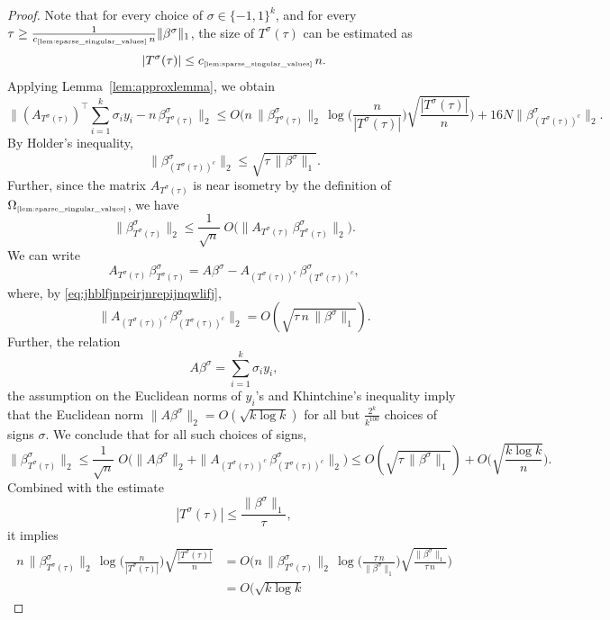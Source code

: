 \documentclass[11pt]{amsart}
\theoremstyle{definition}
\theoremstyle{plain}
\begin{document}
\begin{proof}
Note that for every choice of $\sigma\in\{-1,1\}^k$,
and for every $\tau\geq \frac{1}{c_{\text{\tiny\ref{lem:sparse_singular_values}}}\,n}
\|\beta^\sigma\|_1$,
the size of $T^\sigma(\tau)$ can be estimated as
$$
|T^\sigma(\tau)|\leq c_{\text{\tiny\ref{lem:sparse_singular_values}}}\,n.
$$
Applying Lemma~\ref{lem:approxlemma}, we obtain
$$
\Big\|(A_{T^\sigma(\tau)})^\top
\sum_{i=1}^k \sigma_i y_i 
-n\,\beta^\sigma_{T^\sigma(\tau)}
\Big\|_2
\leq
  O
  \bigg(n\,\|\beta^\sigma_{T^\sigma(\tau)}\|_2\,
  \log\Big(\frac{n}{|T^\sigma(\tau)|}\Big)
  \sqrt{\frac{|T^\sigma(\tau)|}{n}}\bigg)
  +16 N \|\beta^\sigma_{(T^\sigma(\tau))^c}\|_2.
$$
By Holder's inequality,
\begin{equation}\label{eq:jhblfjnpeirjnrepijnqwlifj}
\|\beta^\sigma_{(T^\sigma(\tau))^c}\|_2
\leq \sqrt{\tau\,\|\beta^\sigma\|_1}.    
\end{equation}
Further, since the matrix $A_{T^\sigma(\tau)}$
is near isometry by the definition of
$\Omega_{\text{\tiny\ref{lem:sparse_singular_values}}}$,
we have
$$
\|\beta^\sigma_{T^\sigma(\tau)}\|_2
\leq \frac{1}{\sqrt{n}}\;
O\big(\|A_{T^\sigma(\tau)}\,\beta^\sigma_{T^\sigma(\tau)}\|_2\big).
$$
We can write
$$
A_{T^\sigma(\tau)}\,\beta^\sigma_{T^\sigma(\tau)}
=
A \beta^\sigma
-
A_{(T^\sigma(\tau))^c}\,\beta^\sigma_{(T^\sigma(\tau))^c},
$$
where, by \eqref{eq:jhblfjnpeirjnrepijnqwlifj},
$$
\big\|
A_{(T^\sigma(\tau))^c}\,\beta^\sigma_{(T^\sigma(\tau))^c}
\big\|_2
=O(\sqrt{\tau\,n\,\|\beta^\sigma\|_1}).
$$
Further, the relation
$$
A \beta^\sigma
=\sum_{i=1}^k \sigma_i y_i,
$$
the assumption on the Euclidean
norms of $y_i$'s and Khintchine's inequality imply that the Euclidean norm
$\|A \beta^\sigma\|_2=O(\sqrt{k\log k})$
for all but $\frac{2^k}{k^{100}}$
choices of signs $\sigma$.
We conclude that for all such choices of signs,
$$
\|\beta^\sigma_{T^\sigma(\tau)}\|_2
\leq
\frac{1}{\sqrt{n}}\;
O\big(\|A \beta^\sigma\|_2
+\|A_{(T^\sigma(\tau))^c}\,\beta^\sigma_{(T^\sigma(\tau))^c}\|_2\big)
\leq O(\sqrt{\tau\,\|\beta^\sigma\|_1})
+O\Big(\sqrt{\frac{k\log k}{n}}\Big).
$$
Combined with the estimate
$$
|T^\sigma(\tau)|
\leq \frac{\|\beta^\sigma\|_1}{\tau},
$$
it implies
\begin{align*}
n\,\|\beta^\sigma_{T^\sigma(\tau)}\|_2\,
  \log\Big(\frac{n}{|T^\sigma(\tau)|}\Big)
  \sqrt{\frac{|T^\sigma(\tau)|}{n}}
&=O\bigg(
n\,\|\beta^\sigma_{T^\sigma(\tau)}\|_2\,
  \log\Big(\frac{\tau\,n}{\|\beta^\sigma\|_1}\Big)
  \sqrt{\frac{\|\beta^\sigma\|_1}{\tau\,n}}
\bigg)\\
&=
O\bigg(
\sqrt{k\log k}\,

\end{align*}
\end{proof}
\end{document}
